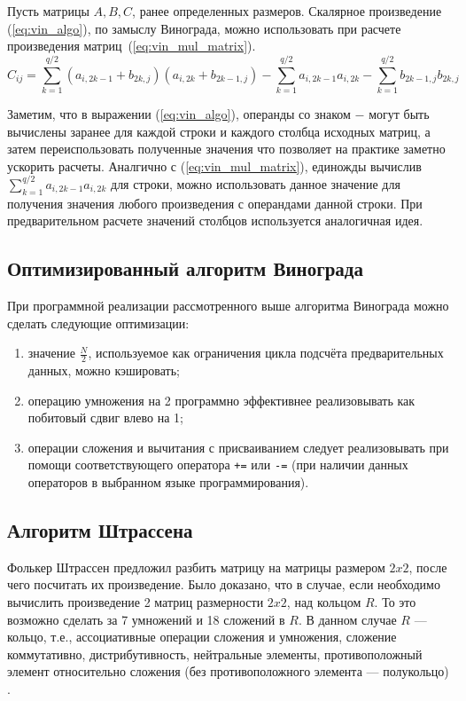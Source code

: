 Пусть матрицы $A, B, C$, ранее определенных размеров. Скалярное произведение (\ref{eq:vin_algo}), по замыслу Винограда, можно использовать при расчете 
произведения матриц~(\ref{eq:vin_mul_matrix}).
\begin{equation} 
	\label{eq:vin_mul_matrix}
	C_{ij} = \sum_{k=1}^{q/2}(a_{i,2k-1} + b_{2k,j})(a_{i,2k} + b_{2k-1,j}) - \sum_{k=1}^{q/2} a_{i,2k-1}a_{i,2k} - \sum_{k=1}^{q/2} b_{2k-1,j}b_{2k,j}
\end{equation}


Заметим, что в выражении (\ref{eq:vin_algo}), операнды со знаком $-$ могут быть вычислены заранее для каждой
строки и каждого столбца исходных матриц, а затем переиспользовать полученные значения что позволяет на практике заметно ускорить расчеты.
Аналгично с (\ref{eq:vin_mul_matrix}), единожды вычислив $\sum_{k=1}^{q/2}a_{i,2k-1}a_{i,2k}$ для строки, можно использовать данное
значение для получения значения любого произведения с операндами данной строки. При  предварительном расчете 
значений столбцов используется аналогичная идея.



\subsection{Оптимизированный алгоритм Винограда}

При программной реализации рассмотренного выше алгоритма Винограда можно сделать следующие оптимизации:
\begin{enumerate}
	\item значение $\frac{N}{2}$, используемое как ограничения цикла подсчёта предварительных данных, можно кэшировать;
	\item операцию умножения на 2 программно эффективнее реализовывать как побитовый сдвиг влево на 1;
	\item операции сложения и вычитания с присваиванием следует реализовывать при помощи соответствующего оператора \texttt{+=} или \texttt{-=} (при наличии данных операторов в выбранном языке программирования).
\end{enumerate}

\subsection{Алгоритм Штрассена}
Фолькер Штрассен предложил разбить матрицу на матрицы размером $2x2$, после чего посчитать их произведение. Было доказано, что в случае, если необходимо вычислить
произведение 2 матриц размерности $2x2$, над кольцом $R$. То это возможно сделать за 7 умножений и 18 сложений в $R$. В данном случае $R$ — кольцо, т.е., ассоциативные операции сложения и умножения, сложение коммутативно, дистрибутивность, нейтральные элементы, противоположный элемент относительно
сложения (без противоположного элемента — полукольцо) \cite{strassen}.

